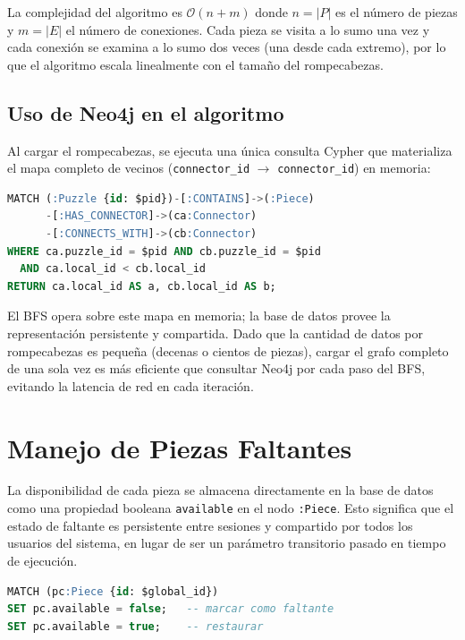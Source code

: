 \documentclass[12pt,a4paper]{article}
\begin{document}
La complejidad del algoritmo es $\mathcal{O}(n + m)$ donde $n = |P|$ es el
número de piezas y $m = |E|$ el número de conexiones. Cada pieza se visita a lo
sumo una vez y cada conexión se examina a lo sumo dos veces (una desde cada
extremo), por lo que el algoritmo escala linealmente con el tamaño del
rompecabezas.

\subsection{Uso de Neo4j en el algoritmo}

Al cargar el rompecabezas, se ejecuta una única consulta Cypher que materializa
el mapa completo de vecinos (\texttt{connector\_id} $\to$ \texttt{connector\_id})
en memoria:

\begin{lstlisting}[language=SQL]
MATCH (:Puzzle {id: $pid})-[:CONTAINS]->(:Piece)
      -[:HAS_CONNECTOR]->(ca:Connector)
      -[:CONNECTS_WITH]->(cb:Connector)
WHERE ca.puzzle_id = $pid AND cb.puzzle_id = $pid
  AND ca.local_id < cb.local_id
RETURN ca.local_id AS a, cb.local_id AS b;
\end{lstlisting}

El BFS opera sobre este mapa en memoria; la base de datos provee la
representación persistente y compartida. Dado que la cantidad de datos por
rompecabezas es pequeña (decenas o cientos de piezas), cargar el grafo completo
de una sola vez es más eficiente que consultar Neo4j por cada paso del BFS,
evitando la latencia de red en cada iteración.

\section{Manejo de Piezas Faltantes}

La disponibilidad de cada pieza se almacena directamente en la base de datos
como una propiedad booleana \texttt{available} en el nodo \texttt{:Piece}.
Esto significa que el estado de faltante es persistente entre sesiones y
compartido por todos los usuarios del sistema, en lugar de ser un parámetro
transitorio pasado en tiempo de ejecución.

\begin{lstlisting}[language=SQL, caption={Actualizar disponibilidad de una pieza en Neo4j}]
MATCH (pc:Piece {id: $global_id})
SET pc.available = false;   -- marcar como faltante
SET pc.available = true;    -- restaurar
\end{lstlisting}
\end{document}
